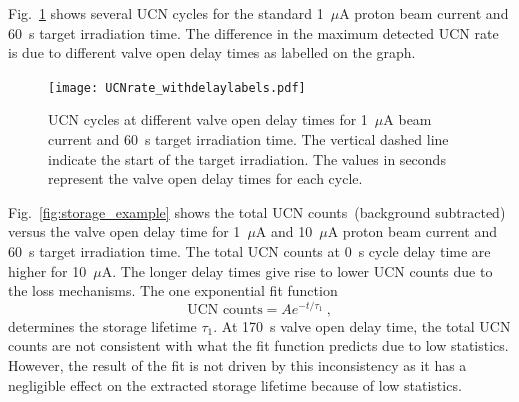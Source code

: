 Fig.~\ref{fig:storage_all} shows several UCN cycles for the standard
1~$\mu$A proton beam current and 60~s target irradiation time. The
difference in the maximum detected UCN rate is due to different valve
open delay times as labelled on the graph.
\begin{figure}[h!]
  \centering
  \texttt{[image: UCNrate\_withdelaylabels.pdf]}
  \caption[UCN rate at different value open delay times at 1~$\mu$A
  beam current and 60~s irradiation time ]{UCN cycles at different
    valve open delay times for 1~$\mu$A beam current and 60~s target
    irradiation time. The vertical dashed line indicate the start of
    the target irradiation. The values in seconds represent the valve
    open delay times for each cycle.}
  \label{fig:storage_all}
\end{figure}
Fig.~\ref{fig:storage_example} shows the total UCN counts~(background
subtracted) versus the valve open delay time for 1~$\mu$A and
10~$\mu$A proton beam current and 60~s target irradiation time. The
total UCN counts at 0~s cycle delay time are higher for 10~$\mu$A. The
longer delay times give rise to lower UCN counts due to the loss
mechanisms. The one exponential fit function
\begin{equation}
\text{UCN counts} = A e^{-t/\tau_1}~,
\end{equation}
determines the storage lifetime $\tau_1$. At 170~s valve open delay
time, the total UCN counts are not consistent with what the fit
function predicts due to low statistics. However, the result of the
fit is not driven by this inconsistency as it has a negligible effect
on the extracted storage lifetime because of low statistics.

